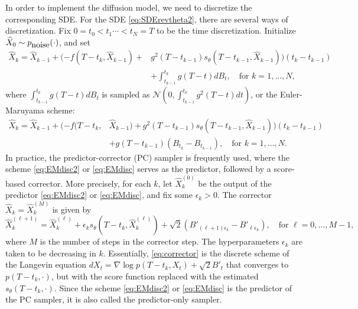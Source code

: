 \documentclass[letterpaper,11pt,reqno]{amsart}
\numberwithin{equation}{section}
\begin{document}
In order to implement the diffusion model,
we need to discretize the corresponding SDE.
For the SDE \eqref{eq:SDErevtheta2},
there are several ways of discretization.
Fix $0 = t_0 < t_1 \cdots < t_N = T$ 
to be the time discretization. 
Initialize $\widehat{X}_0 \sim p_{\tiny \mbox{noise}}(\cdot)$, 
and set
\begin{equation}
\label{eq:EMdisc2}
\begin{aligned}
\widehat{X}_k = \widehat{X}_{k-1} + (-f(T - t_k, \widehat{X}_{k-1}) + 
 &g^2(T - t_{k-1}) s_\theta(T - t_{k-1}, \widehat{X}_{k-1})) (t_k - t_{k-1}) \\
& + \int_{t_{k-1}}^{t_k} g(T-t) dB_t, 
\quad \mbox{for } k = 1,\ldots, N,
\end{aligned}
\end{equation}
where $\int_{t_{k-1}}^{t_k}g(T-t) dB_t$
is sampled as $\mathcal{N}(0, \int_{t_{k-1}}^{t_k}g^2(T-t) dt)$,
or the Euler-Maruyama scheme:
\begin{equation}
\label{eq:EMdisc}
\begin{aligned}
\widehat{X}_k = \widehat{X}_{k-1} + (-f(T - t_k, &\widehat{X}_{k-1}) + 
 g^2(T - t_{k-1}) s_\theta(T - t_{k-1}, \widehat{X}_{k-1})) (t_k - t_{k-1}) \\
& + g(T-t_{k-1}) (B_{t_k} - B_{t_{k-1}}), 
\quad \mbox{for } k = 1,\ldots, N.
\end{aligned}
\end{equation}
In practice,
the predictor-corrector (PC) sampler \cite{Song20} is frequently used,
where the scheme \eqref{eq:EMdisc2} or \eqref{eq:EMdisc} serves as
the predictor,
followed by a score-based corrector.
More precisely, for each $k$, 
let $\widehat{X}^{(0)}_k$ be the output of the predictor 
\eqref{eq:EMdisc2} or \eqref{eq:EMdisc},
and fix some $\epsilon_k > 0$.
The corrector $\widehat{X}_k = \widehat{X}_k^{(M)}$
is given by
\begin{equation}
\label{eq:corrector}
\widehat{X}^{(\ell+1)}_k = \widehat{X}^{(\ell)}_k + \epsilon_k s_\theta(T-t_k, \widehat{X}^{(\ell)}_k)
+ \sqrt{2}(B'_{(\ell + 1) \epsilon_k} - B'_{\ell \epsilon_k}),
\quad \mbox{for } \ell = 0, \ldots, M-1,
\end{equation}
where $M$ is the number of steps in the corrector step.
The hyperparameters $\epsilon_k$ are 
taken to be decreasing in $k$.
Essentially,
\eqref{eq:corrector} is the discrete scheme of 
the Langevin equation 
$dX_t = \nabla \log p (T-t_k,X_t) + \sqrt{2} B'_t$
that converges to $p(T-t_k, \cdot)$,
but with the score function replaced with the estimated $s_\theta(T-t_k, \cdot)$.
Since the scheme \eqref{eq:EMdisc2} or \eqref{eq:EMdisc} 
is the predictor of the PC sampler, 
it is also called the predictor-only sampler. 
\end{document}
